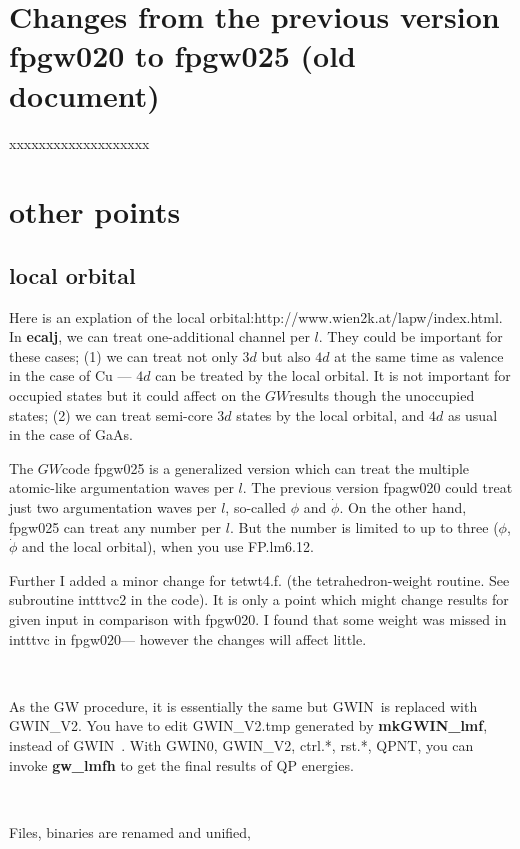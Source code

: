 \documentclass[a4paper,10pt,epsf,fleqn]{article}
\newcommand{\GW}{$GW$}
\newcommand{\GWIN}{{\sf GWIN}\ }
\newcommand{\exe}[1]{{\bf #1}}
\begin{document}
\section{Changes from the previous version fpgw020 to fpgw025 (old document)}
xxxxxxxxxxxxxxxxxxx

\section{other points}
\subsection{local orbital}
Here is an explation of the local orbital:http://www.wien2k.at/lapw/index.html.
In \exe{ecalj}, we can treat one-additional channel per $l$.
They could be important for these cases;
(1) we can treat not only $3d$ but also $4d$ at the same
time as valence in the case of Cu --- $4d$ can be treated 
by the local orbital. It is not important for occupied states 
but it could affect on the \GW results though
the unoccupied states; 
(2) we can treat semi-core $3d$ states by the local orbital,
and $4d$ as usual in the case of GaAs.


The \GW code fpgw025 is a generalized version which can treat
the multiple atomic-like argumentation waves per $l$.
The previous version fpagw020 could treat just 
two argumentation waves per $l$, so-called $\phi$ and $\dot{\phi}$.
On the other hand, fpgw025 can treat any number per $l$.
But the number is limited to up to three 
($\phi$, $\dot{\phi}$ and the local orbital), 
when you use FP.lm6.12. 

Further I added a minor change for tetwt4.f.
(the tetrahedron-weight routine. See subroutine intttvc2 in the code).
It is only a point which might change results for given input
in comparison with fpgw020.
I found that some weight was missed in intttvc in fpgw020---
however the changes will affect little.

\ 

As the GW procedure, it is essentially the same
but \GWIN is replaced with {\sf GWIN\_V2}.
You have to edit {\sf GWIN\_V2.tmp} generated by \exe{mkGWIN\_lmf},
instead of \GWIN. With {\sf GWIN0}, {\sf GWIN\_V2},
{\sf ctrl.*}, {\sf rst.*}, {\sf QPNT}, you can invoke \exe{gw\_lmfh}
to get the final results of QP energies.

\ 

Files, binaries are renamed and unified,
\end{document}
